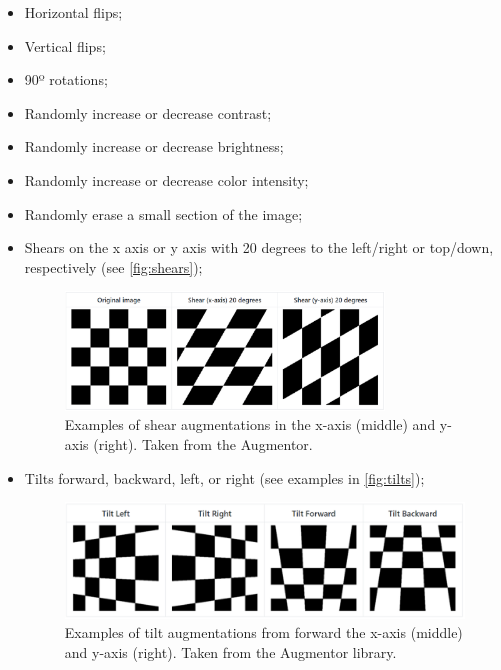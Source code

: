     \begin{itemize}
        \item Horizontal flips;
        \item Vertical flips;
        \item 90º rotations;
        \item Randomly increase or decrease contrast;
        \item Randomly increase or decrease brightness;
        \item Randomly increase or decrease color intensity;
        \item Randomly erase a small section of the image;
        \item Shears on the x axis or y axis with 20 degrees to the left/right or top/down, respectively (see \autoref{fig:shears});
        \begin{figure}[ht]
            \centering
            \includegraphics[width=0.8\textwidth]{figs/shear.PNG}
            \caption[Examples of shear augmentations.]{Examples of shear augmentations in the x-axis (middle) and y-axis (right). Taken from the Augmentor\footnotemark .}
            \label{fig:shears}
        \end{figure}
        \item Tilts forward, backward, left, or right (see examples in \autoref{fig:tilts});
        \begin{figure}[ht]
            \centering
            \includegraphics[width=\textwidth]{figs/tilt.PNG}
            \caption[Examples of tilt augmentations from forward the x-axis (middle) and y-axis (right).]{Examples of tilt augmentations from forward the x-axis (middle) and y-axis (right). Taken from the Augmentor library.}
            \label{fig:tilts}

\end{figure}
\end{itemize}
